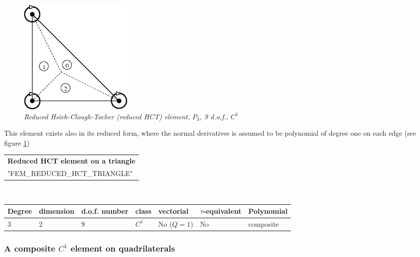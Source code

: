 \documentclass[10pt,a4paper]{article}
\begin{document}
\begin{figure}[H]
  \begin{center}
    \includegraphics[width=5.5cm,angle=0]{getfemlist_reduced_HCT.eps}
  \end{center}
  \caption{ \it Reduced Hsieh-Clough-Tocher (reduced HCT) element, $P_3$, 9 d.o.f., $C^1$}
  \label{fig:reduced_HCT_tr}
\end{figure}

This element exists also in its reduced form, where the normal derivatives is assumed to be polynomial of degree one on each edge (see figure \ref{fig:reduced_HCT_tr})



\begin{center}
\begin{tabular}{|m{16.11cm}|} \hline 
{ \bf Reduced HCT element on a triangle}\\
"FEM\_REDUCED\_HCT\_TRIANGLE"
\end{tabular} \\ \vspace{-1pt} 
\begin{tabular}{|m{2cm}|m{2cm}|m{2.5cm}|m{1.2cm}|m{2cm}|m{2cm}|m{1.8cm}|} \hline 
Degree & dimension & d.o.f. number & class & vectorial & \mbox{$\tau$-equivalent} & Polynomial \\ \hline
$3$ & $2$ & $9$ & $C^1$ & No \mbox{($Q = 1$)} & No & composite\\ \hline
\end{tabular}
\end{center}

\subsubsection{A composite $C^1$ element on quadrilaterals}
\end{document}
